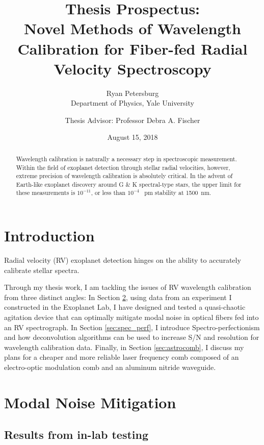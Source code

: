 \documentclass[12pt]{article}
\title{Thesis Prospectus:\\ Novel Methods of Wavelength Calibration for Fiber-fed Radial Velocity Spectroscopy}
\author{Ryan Petersburg\\ Department of Physics, Yale University
\and Thesis Advisor: Professor Debra A. Fischer}
\date{August 15, 2018}
\begin{document}
\maketitle

\begin{abstract}

Wavelength calibration is naturally a necessary step in spectroscopic measurement. Within the field of exoplanet detection through stellar radial velocities, however, extreme precision of wavelength calibration is absolutely critical. In the advent of Earth-like exoplanet discovery around G \& K spectral-type stars, the upper limit for these measurements is $10^{-11}$, or less than $10^{-4}$ \SI{}{\pico\meter} stability at \SI{1500}{\nano\meter}.

\end{abstract}

\pagebreak

\section{Introduction}

Radial velocity (RV) exoplanet detection hinges on the ability to accurately calibrate stellar spectra. 

Through my thesis work, I am tackling the issues of RV wavelength calibration from three distinct angles: In Section \ref{sec:modal_noise}, using data from an experiment I constructed in the Exoplanet Lab, I have designed and tested a quasi-chaotic agitation device that can optimally mitigate modal noise in optical fibers fed into an RV spectrograph. In Section \ref{sec:spec_perf}, I introduce Spectro-perfectionism and how deconvolution algorithms can be used to increase S/N and resolution for wavelength calibration data. Finally, in Section \ref{sec:astrocomb}, I discuss my plans for a cheaper and more reliable laser frequency comb composed of an electro-optic modulation comb and an aluminum nitride waveguide.

\section{Modal Noise Mitigation}
\label{sec:modal_noise}



\subsection{Results from in-lab testing}
\end{document}
